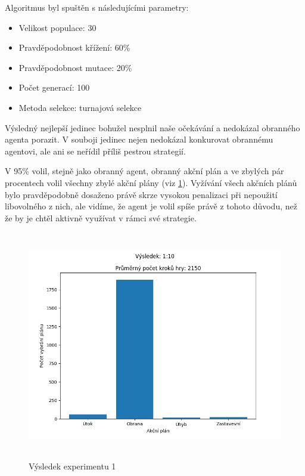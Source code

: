 Algoritmus byl spuštěn s následujícími parametry:
\begin{itemize}
    \item Velikost populace: 30
    \item Pravděpodobnost křížení: 60\%
    \item Pravděpodobnost mutace: 20\%
    \item Počet generací: 100
    \item Metoda selekce: turnajová selekce
\end{itemize}

Výsledný nejlepší jedinec bohužel nesplnil naše očekávání a nedokázal obranného agenta porazit. 
V souboji jedinec nejen nedokázal konkurovat obrannému agentovi, ale ani se neřídil příliš pestrou strategií.

V 95\% volil, stejně jako obranný agent, obranný akční plán a ve zbylých pár procentech volil všechny zbylé akční plány (viz \ref{Výsledek experimentu 01}).
Vyžívání všech akčních plánů bylo pravděpodobně dosaženo právě skrze vysokou penalizaci při nepoužití libovolného z nich, ale vidíme, že agent je volil spíše právě z tohoto důvodu, než že by je chtěl aktivně využívat v rámci své strategie.

\begin{figure}[p]\centering
\includegraphics[width=125mm, height=100mm]{./Obrazky/Experiment01Results.png}
\caption{Výsledek experimentu 1}
\label{Výsledek experimentu 01}
\end{figure}



\newpage
